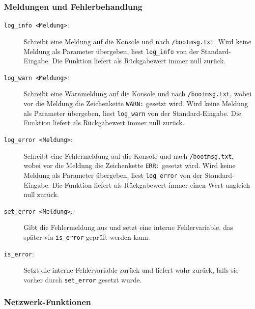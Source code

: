 \subsubsection{Meldungen und Fehlerbehandlung}

\begin{description}

\item[\texttt{log\_info <Meldung>}:] Schreibt eine Meldung auf
die Konsole und nach \texttt{/bootmsg.txt}. Wird keine Meldung als
Parameter übergeben, liest \texttt{log\_info} von der Standard-Eingabe. Die
Funktion liefert als Rückgabewert immer null zurück.

\item[\texttt{log\_warn <Meldung>}:] Schreibt eine Warnmeldung auf
die Konsole und nach \texttt{/bootmsg.txt}, wobei vor die Meldung die
Zeichenkette \texttt{WARN:} gesetzt wird. Wird keine Meldung als
Parameter übergeben, liest \texttt{log\_warn} von der Standard-Eingabe.
Die Funktion liefert als Rückgabewert immer null zurück.

\item[\texttt{log\_error <Meldung>}:] Schreibt eine Fehlermeldung auf
die Konsole und nach \texttt{/bootmsg.txt}, wobei vor die Meldung die
Zeichenkette \texttt{ERR:} gesetzt wird. Wird keine Meldung als
Parameter übergeben, liest \texttt{log\_error} von der Standard-Eingabe.
Die Funktion liefert als Rückgabewert immer einen Wert ungleich null zurück.

\item[\texttt{set\_error <Meldung>}:] Gibt die Fehlermeldung aus und setzt
eine interne Fehlervariable, das später via \texttt{is\_error} geprüft werden
kann.

\item[\texttt{is\_error}:] Setzt die interne Fehlervariable zurück und liefert
wahr zurück, falls sie vorher durch \texttt{set\_error} gesetzt wurde.

\end{description}

\subsubsection{Netzwerk-Funktionen}

